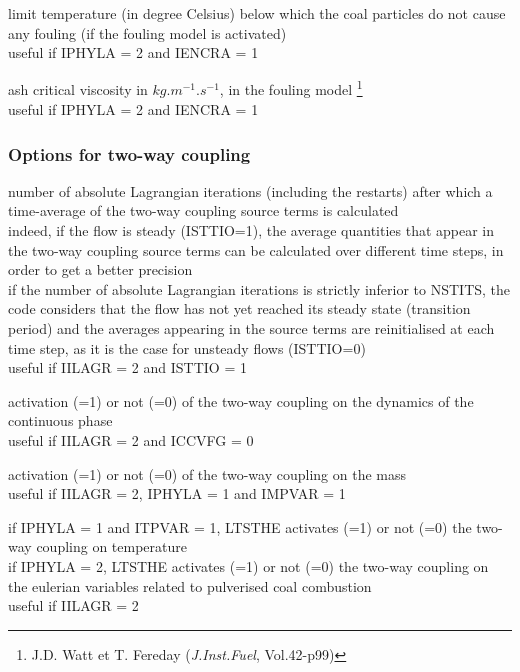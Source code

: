 {limit temperature (in degree Celsius) below which the coal particles do
not cause any fouling (if the fouling model is activated)\\
useful if IPHYLA = 2 and IENCRA = 1}

{ash critical viscosity in $kg.m^{-1}.s^{-1}$, in the fouling model
\footnote{J.D. Watt
et T. Fereday (\textit{J.Inst.Fuel}, Vol.42-p99)}\\
useful if IPHYLA = 2 and IENCRA = 1}

\subsubsection{Options for two-way coupling}

{number of absolute Lagrangian iterations (including the restarts)
after which a time-average of the two-way coupling source terms is
calculated\\
indeed, if the flow is steady (ISTTIO=1), the average quantities that appear in
the two-way coupling source terms can be calculated over different time steps,
in order to get a better precision\\
if the number of absolute Lagrangian iterations is strictly inferior to
NSTITS, the code considers that the flow has not yet reached its steady state
(transition period) and the averages appearing in the source terms are
reinitialised at each time step, as it is the case for unsteady flows (ISTTIO=0)\\
useful if IILAGR = 2 and ISTTIO = 1}

{activation (=1) or not (=0) of the two-way coupling on the dynamics of the
continuous phase\\
useful if IILAGR = 2 and ICCVFG = 0}

{activation (=1) or not (=0) of the two-way coupling on the mass\\
useful if IILAGR = 2, IPHYLA = 1 and IMPVAR = 1}

{if IPHYLA = 1 and ITPVAR = 1, LTSTHE activates (=1) or not (=0) the
two-way coupling on temperature\\
if IPHYLA = 2, LTSTHE activates (=1) or not (=0) the two-way coupling
on the eulerian variables related to pulverised coal combustion\\
useful if IILAGR = 2}


